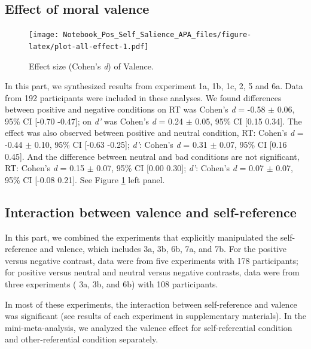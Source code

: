 \documentclass[
  english,
  man]{apa6}
\begin{document}
\hypertarget{effect-of-moral-valence}{%
\subsection{Effect of moral valence}\label{effect-of-moral-valence}}

\begin{figure}
\centering
\texttt{[image: Notebook\_Pos\_Self\_Salience\_APA\_files/figure-latex/plot-all-effect-1.pdf]}
\caption{\label{fig:plot-all-effect}Effect size (Cohen's \emph{d}) of Valence.}
\end{figure}

In this part, we synthesized results from experiment 1a, 1b, 1c, 2, 5 and 6a. Data from 192 participants were included in these analyses. We found differences between positive and negative conditions on RT was Cohen's \emph{d} = -0.58 \(\pm\) 0.06, 95\% CI {[}-0.70 -0.47{]}; on \emph{d'} was Cohen's \emph{d} = 0.24 \(\pm\) 0.05, 95\% CI {[}0.15 0.34{]}. The effect was also observed between positive and neutral condition, RT: Cohen's \emph{d} = -0.44 \(\pm\) 0.10, 95\% CI {[}-0.63 -0.25{]}; \emph{d'}: Cohen's \emph{d} = 0.31 \(\pm\) 0.07, 95\% CI {[}0.16 0.45{]}. And the difference between neutral and bad conditions are not significant, RT: Cohen's \emph{d} = 0.15 \(\pm\) 0.07, 95\% CI {[}0.00 0.30{]}; \emph{d'}: Cohen's \emph{d} = 0.07 \(\pm\) 0.07, 95\% CI {[}-0.08 0.21{]}. See Figure \ref{fig:plot-all-effect} left panel.

\hypertarget{interaction-between-valence-and-self-reference}{%
\subsection{Interaction between valence and self-reference}\label{interaction-between-valence-and-self-reference}}

In this part, we combined the experiments that explicitly manipulated the self-reference and valence, which includes 3a, 3b, 6b, 7a, and 7b. For the positive versus negative contrast, data were from five experiments with 178 participants; for positive versus neutral and neutral versus negative contrasts, data were from three experiments ( 3a, 3b, and 6b) with 108 participants.

In most of these experiments, the interaction between self-reference and valence was significant (see results of each experiment in supplementary materials). In the mini-meta-analysis, we analyzed the valence effect for self-referential condition and other-referential condition separately.
\end{document}
